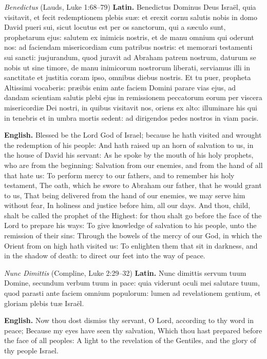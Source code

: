 \begin{massbox}{\textit{Benedictus} (Lauds, Luke 1:68--79)}
\textbf{Latin.} Benedictus Dominus Deus Isra\"el, quia visitavit, et fecit
redemptionem plebis su\ae{}: et erexit cornu salutis nobis in domo David pueri
sui, sicut locutus est per os sanctorum, qui a s\ae culo sunt, prophetarum ejus:
salutem ex inimicis nostris, et de manu omnium qui oderunt nos: ad faciendam
misericordiam cum patribus nostris: et memorari testamenti sui sancti:
jusjurandum, quod juravit ad Abraham patrem nostrum, daturum se nobis ut sine
timore, de manu inimicorum nostrorum liberati, serviamus illi in sanctitate et
justitia coram ipso, omnibus diebus nostris. Et tu puer, propheta Altissimi
vocaberis: pr\ae ibis enim ante faciem Domini parare vias ejus, ad dandam
scientiam salutis plebi ejus in remissionem peccatorum eorum per viscera
misericordi\ae{} Dei nostri, in quibus visitavit nos, oriens ex alto: illuminare
his qui in tenebris et in umbra mortis sedent: ad dirigendos pedes nostros in
viam pacis.

\textbf{English.} Blessed be the Lord God of Israel; because he hath visited and
wrought the redemption of his people: And hath raised up an horn of salvation to
us, in the house of David his servant: As he spoke by the mouth of his holy
prophets, who are from the beginning: Salvation from our enemies, and from the
hand of all that hate us: To perform mercy to our fathers, and to remember his
holy testament, The oath, which he swore to Abraham our father, that he would
grant to us, That being delivered from the hand of our enemies, we may serve him
without fear, In holiness and justice before him, all our days. And thou, child,
shalt be called the prophet of the Highest: for thou shalt go before the face of
the Lord to prepare his ways: To give knowledge of salvation to his people, unto
the remission of their sins: Through the bowels of the mercy of our God, in
which the Orient from on high hath visited us: To enlighten them that sit in
darkness, and in the shadow of death: to direct our feet into the way of peace.
\end{massbox}

\begin{massbox}{\textit{Nunc Dimittis} (Compline, Luke 2:29--32)}
\textbf{Latin.} Nunc dimittis servum tuum Domine, secundum verbum tuum in pace:
quia viderunt oculi mei salutare tuum, quod parasti ante faciem omnium
populorum: lumen ad revelationem gentium, et gloriam plebis tu\ae{} Isra\"el.

\textbf{English.} Now thou dost dismiss thy servant, O Lord, according to thy
word in peace; Because my eyes have seen thy salvation, Which thou hast prepared
before the face of all peoples: A light to the revelation of the Gentiles, and
the glory of thy people Israel.
\end{massbox}
